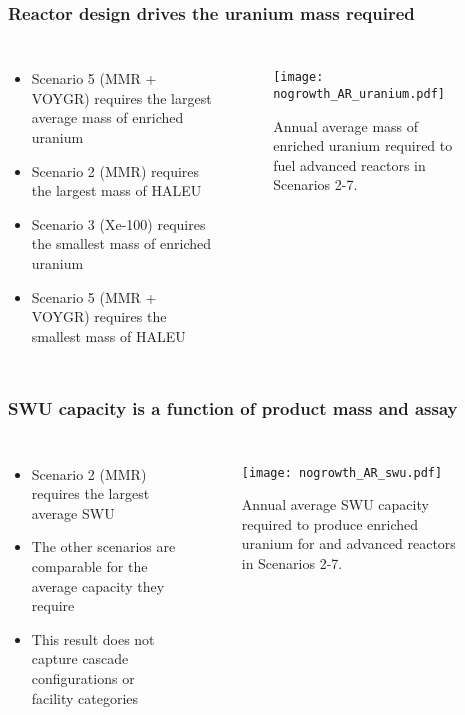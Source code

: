 \begin{frame}
    \frametitle{Reactor design drives the uranium mass required}
    \begin{columns}
        \column[t]{4.5cm}
            \begin{itemize}
                \item Scenario 5 (MMR + VOYGR) requires the largest average mass of 
                      enriched uranium
                \item Scenario 2 (MMR) requires the largest mass of \gls{HALEU}
                \item Scenario 3 (Xe-100) requires the smallest mass of enriched 
                      uranium
                \item Scenario 5 (MMR + VOYGR) requires the smallest mass of \gls{HALEU}
            \end{itemize}
        \column[t]{5.5cm}
        \vspace{-0.8cm}
            \begin{figure}
                \centering
                \texttt{[image: nogrowth\_AR\_uranium.pdf]}
                \caption{Annual average mass of enriched uranium required to fuel
                advanced reactors in Scenarios 2-7.}
                \label{fig:uranium}

        \end{figure}
    \end{columns}
\end{frame}

\begin{frame}
    \frametitle{\gls{SWU} capacity is a function of product mass and assay}
    \begin{columns}
        \column[t]{4.3cm}
            \begin{itemize}
                \item Scenario 2 (MMR) requires the largest average \gls{SWU} 
                \item The other scenarios are comparable for the average 
                      capacity they require
                \item This result does not capture cascade configurations or 
                      facility categories
                
            \end{itemize}
        \column[t]{5.7cm}
        \vspace{-1cm}
        \begin{figure}
                \centering
                \texttt{[image: nogrowth\_AR\_swu.pdf]}
                \caption{Annual average \gls{SWU} capacity required to produce 
                enriched uranium for and advanced reactors in Scenarios 2-7.}
                \label{fig:swu}
        \end{figure}
    \end{columns}
\end{frame}

